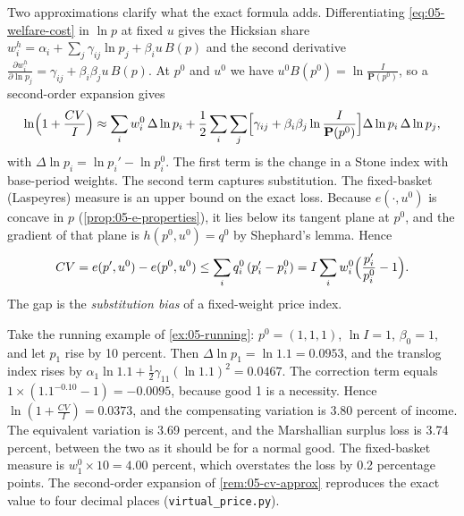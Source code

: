 \begin{remark}\label{rem:05-cv-approx}
Two approximations clarify what the exact formula adds. Differentiating \eqref{eq:05-welfare-cost} in
$\ln p$ at fixed $u$ gives the Hicksian share $w_i^h = \alpha_i + \sum_j\gamma_{ij}\ln p_j + \beta_i u\,B(p)$
and the second derivative $\frac{\partial w^h_i}{\partial\ln p_j} = \gamma_{ij} + \beta_i\beta_j u\,B(p)$. At
$p^0$ and $u^0$ we have $u^0 B(p^0) = \ln\frac{I}{\mathbf{P}(p^0)}$, so a second-order expansion gives
\begin{equation*}
  \ln\Bigl(1 + \frac{CV}{I}\Bigr) \approx \sum_i w_i^0\,\Delta\ln p_i
  + \frac{1}{2}\sum_i\sum_j\Bigl[\gamma_{ij} + \beta_i\beta_j\ln\frac{I}{\mathbf{P}(p^0)}\Bigr]\Delta\ln p_i\,\Delta\ln p_j,
\end{equation*}
with $\Delta\ln p_i = \ln p_i' - \ln p_i^0$. The first term is the change in a Stone index with base-period
weights. The second term captures substitution. The fixed-basket (Laspeyres) measure is an upper bound on the
exact loss. Because $e(\cdot,u^0)$ is concave in $p$ (\cref{prop:05-e-properties}), it lies below its tangent
plane at $p^0$, and the gradient of that plane is $h(p^0,u^0) = q^0$ by Shephard's lemma. Hence
\begin{equation*}
  CV = e(p',u^0) - e(p^0,u^0) \le \sum_i q_i^0\,(p_i' - p_i^0) = I\sum_i w_i^0\Bigl(\frac{p_i'}{p_i^0} - 1\Bigr).
\end{equation*}
The gap is the \emph{substitution bias} of a fixed-weight price index.
\end{remark}

\begin{example}\label{ex:05-cv-running}
Take the running example of \cref{ex:05-running}: $p^0 = (1,1,1)$, $\ln I = 1$, $\beta_0 = 1$, and let $p_1$
rise by 10 percent. Then $\Delta\ln p_1 = \ln 1.1 = 0.0953$, and the translog index rises by
$\alpha_1\ln 1.1 + \frac{1}{2}\gamma_{11}(\ln 1.1)^2 = 0.0467$. The correction term equals
$1 \times (1.1^{-0.10} - 1) = -0.0095$, because good 1 is a necessity. Hence $\ln(1 + \frac{CV}{I}) = 0.0373$,
and the compensating variation is 3.80 percent of income. The equivalent variation is 3.69 percent, and the
Marshallian surplus loss is 3.74 percent, between the two as it should be for a normal good. The fixed-basket
measure is $w_1^0 \times 10 = 4.00$ percent, which overstates the loss by 0.2 percentage points. The second-order
expansion of \cref{rem:05-cv-approx} reproduces the exact value to four decimal places
(\texttt{virtual\_price.py}).
\end{example}

